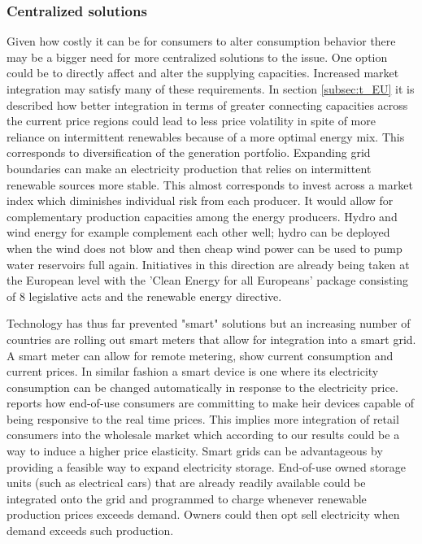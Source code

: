 \subsubsection{Centralized solutions}
Given how costly it can be for consumers to alter consumption behavior there may be a bigger need for more centralized solutions to the issue. One option could be to directly affect and alter the supplying capacities.
Increased market integration may satisfy many of these requirements. In section \ref{subsec:t_EU} it is described how better integration in terms of greater connecting capacities across the current price regions could lead to less price volatility in spite of more reliance on intermittent renewables because of a more optimal energy mix. This corresponds to diversification of the generation portfolio. Expanding grid boundaries can make an electricity production that relies on intermittent renewable sources more stable. This almost corresponds to invest across a market index which diminishes individual risk from each producer. It would allow for complementary production capacities among the energy producers. Hydro and wind energy for example complement each other well;  hydro can be deployed when the wind does not blow and then cheap wind power can be used to pump water reservoirs full again. Initiatives in this direction are already being taken at the European level with the 'Clean Energy for all Europeans' package consisting of 8 legislative acts and the renewable energy directive.
\bigskip

Technology has thus far prevented "smart" solutions but an increasing number of countries are rolling out smart meters that allow for integration into a smart grid. A smart meter can allow for remote metering, show current consumption and current prices. In similar fashion a smart device is one where its electricity consumption can be changed automatically in response to the electricity price.
\citet{biggar2014economics} reports how end-of-use consumers are committing to make heir devices capable of being responsive to the real time prices. This implies more integration of retail consumers into the wholesale market which according to our results could be a way to induce a higher price elasticity. Smart grids can be advantageous by providing a feasible way to expand electricity storage. End-of-use owned storage units (such as electrical cars) that are already readily available could be integrated onto the grid and programmed to charge whenever renewable production prices exceeds demand. Owners could then opt sell electricity when demand exceeds such production. 
